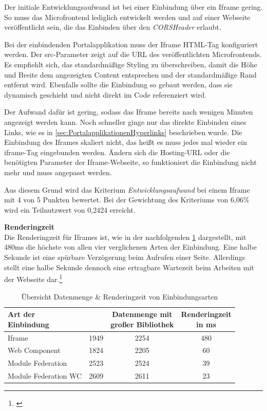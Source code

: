 Der initiale Entwicklungsaufwand ist bei einer Einbindung über ein Iframe gering. So muss das Microfrontend lediglich entwickelt werden und auf einer Webseite veröffentlicht sein, die das Einbinden über den \textit{\gls{CORSHeader}} erlaubt.

Bei der einbindenden Portalapplikation muss der Iframe \gls{HTML}-Tag konfiguriert werden. Der src-Parameter zeigt auf die \gls{URL} des veröffentlichten Microfrontends. Es empfiehlt sich, das standardmäßige Styling zu überschreiben, damit die Höhe und Breite dem angezeigten Content entsprechen und der standardmäßige Rand entfernt wird. Ebenfalls sollte die Einbindung so gebaut werden, dass sie dynamisch geschieht und nicht direkt im Code referenziert wird.

Der Aufwand dafür ist gering, sodass das Iframe bereits nach wenigen Minuten angezeigt werden kann. Noch schneller ginge nur das direkte Einbinden eines Links, wie es in \cref{sec:PortalapplikationenHyperlinks} beschrieben wurde. Die Einbindung des Iframes skaliert nicht, das heißt es muss jedes mal wieder ein iframe-Tag eingebunden werden. Ändern sich die Hosting-URL oder die benötigten Parameter der Iframe-Webseite, so funktioniert die Einbindung nicht mehr und muss angepasst werden.

Aus diesem Grund wird das Kriterium \textit{Entwicklungsaufwand} bei einem Iframe mit 4 von 5 Punkten bewertet. Bei der Gewichtung des Kriteriums von 6,06\% wird ein Teilnutzwert von 0,2424 erreicht.

\textbf{Renderingzeit}\\
Die Renderingzeit für Iframes ist, wie in der nachfolgenden \cref{tab:MessungenEvaluierung} dargestellt, mit 480ms die höchste von allen vier verglichenen Arten der Einbindung. Eine halbe Sekunde ist eine spürbare Verzögerung beim Aufrufen einer Seite. Allerdings stellt eine halbe Sekunde dennoch eine ertragbare Wartezeit beim Arbeiten mit der Webseite dar.\footnote{\cite[vgl.][]{unbounce2022}}

\begin{table}[!hbt]
	\centering
	\begin{minipage}[t]{1\textwidth}	
		\caption{Übersicht Datenmenge \& Renderingzeit von Einbindungsarten} %
		\begin{tabularx}{\columnwidth}{| X | c | c | c |}
			\toprule
			\thead{\textbf{Art der}\\ \textbf{Einbindung}} & \thead{\textbf{Datenmenge in KB}} &
			\thead{\textbf{Datenmenge mit}\\ \textbf{großer Bibliothek}} & \thead{\textbf{Renderingzeit}\\ \textbf{in ms}}\\
			\midrule
			Iframe & 1949 & 2254  & 480 \\
			Web Component & 1824 & 2205 & 60 \\
			Module Federation & 2523 & 2524 & 39 \\
			Module Federation WC & 2609 & 2611 & 23 \\
			\bottomrule
		\end{tabularx}
		\label{tab:MessungenEvaluierung}
	\end{minipage}
\end{table}

